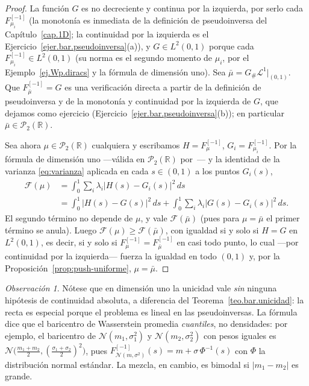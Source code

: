 \documentclass[12pt, a4paper]{amsbook}
\newcommand{\R}{{\mathbb R}}
\theoremstyle{remark}
\newtheorem{obs}[teo]{Observación}
\theoremstyle{definition}
\numberwithin{section}{chapter}
\numberwithin{subsection}{section}
\numberwithin{equation}{section}
\numberwithin{figure}{chapter}
\begin{document}
\begin{proof}
La función $G$ es no decreciente y continua por la izquierda, por serlo cada
$F_{\mu_i}^{[-1]}$ (la monotonía es inmediata de la definición de pseudoinversa
del Capítulo~\ref{cap.1D}; la continuidad por la izquierda es el
Ejercicio~\ref{ejer.bar.pseudoinversa}(a)), y $G\in L^2(0,1)$ porque
cada $F_{\mu_i}^{[-1]}\in L^2(0,1)$ (su norma es el segundo momento de $\mu_i$,
por el Ejemplo~\ref{ej.Wp.diracs} y la fórmula de dimensión uno). Sea
$\bar\mu=G_\#\mathcal L^1|_{(0,1)}$. Que $F_{\bar\mu}^{[-1]}=G$ es una
verificación directa a partir de la definición de pseudoinversa y de la
monotonía y continuidad por la izquierda de $G$, que dejamos como ejercicio
(Ejercicio~\ref{ejer.bar.pseudoinversa}(b));
en particular $\bar\mu\in\mathcal P_2(\R)$.

Sea ahora $\mu\in\mathcal P_2(\R)$ cualquiera y escribamos $H=F_\mu^{[-1]}$,
$G_i=F_{\mu_i}^{[-1]}$. Por la fórmula de dimensión uno —válida en
$\mathcal P_2(\R)$ por~\cite[Proposition~2.17]{Santambrogio}— y la identidad
de la varianza \eqref{eq:varianza} aplicada en cada $s\in(0,1)$ a los puntos
$G_i(s)$,
\[
\begin{aligned}
\mathcal F(\mu)
&=\int_0^1\sum_i\lambda_i\bigl|H(s)-G_i(s)\bigr|^2\,ds\\
&=\int_0^1\bigl|H(s)-G(s)\bigr|^2\,ds
+\int_0^1\sum_i\lambda_i\bigl|G(s)-G_i(s)\bigr|^2\,ds.
\end{aligned}
\]
El segundo término no depende de $\mu$, y vale $\mathcal F(\bar\mu)$ (pues para
$\mu=\bar\mu$ el primer término se anula). Luego
$\mathcal F(\mu)\ge\mathcal F(\bar\mu)$, con igualdad si y solo si $H=G$ en
$L^2(0,1)$, es decir, si y solo si $F_\mu^{[-1]}=F_{\bar\mu}^{[-1]}$ en casi
todo punto, lo cual —por continuidad por la izquierda— fuerza la igualdad en
todo $(0,1)$ y, por la Proposición~\ref{prop:push-uniforme}, $\mu=\bar\mu$.
\end{proof}

\begin{obs}
Nótese que en dimensión uno la unicidad vale \emph{sin} ninguna hipótesis de
continuidad absoluta, a diferencia del Teorema~\ref{teo.bar.unicidad}: la
recta es especial porque el problema es lineal en las pseudoinversas. La
fórmula dice que el baricentro de Wasserstein promedia \emph{cuantiles}, no
densidades: por ejemplo, el baricentro de $\mathcal N(m_1,\sigma_1^2)$ y
$\mathcal N(m_2,\sigma_2^2)$ con pesos iguales es
$\mathcal N\bigl(\tfrac{m_1+m_2}2,(\tfrac{\sigma_1+\sigma_2}2)^2\bigr)$, pues
$F^{[-1]}_{\mathcal N(m,\sigma^2)}(s)=m+\sigma\,\Phi^{-1}(s)$ con $\Phi$ la
distribución normal estándar. La mezcla, en cambio, es bimodal si
$|m_1-m_2|$ es grande.
\end{obs}
\end{document}
